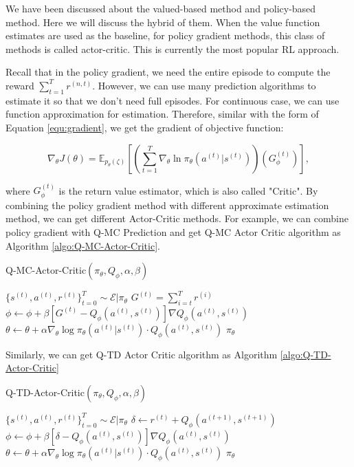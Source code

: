 \documentclass[11pt]{article}
\begin{document}
We have been discussed about the valued-based method and policy-based method. Here we will discuss the hybrid of them. When the value function estimates are used as the baseline, 
for policy gradient methods, this class of methods is called actor-critic. This is currently the most popular RL approach.
  
Recall that in the policy gradient, we need the entire episode to compute the reward $\sum_{t=1}^T r^{(n,t)}$. However, we can use many prediction algorithms to estimate it so that we don’t need full episodes. For continuous case, we can use function approximation for estimation. Therefore, similar with the form of Equation \ref{equ:gradient}, we get the gradient of objective function:

$$\nabla_{\theta} J(\theta) = \mathbb{E}_{p_\theta(\zeta)}[(\sum_{t=1}^T \nabla_\theta \ln \pi_\theta(a^{(t)}|s^{(t)})) (G_\phi^{(t)})],$$

where $G_\phi^{(t)}$ is the return value estimator, which is also called "Critic". By combining the policy gradient method with different approximate estimation method, we can get different Actor-Critic methods. For example, we can combine policy gradient with Q-MC Prediction and get Q-MC Actor Critic algorithm as Algorithm \ref{algo:Q-MC-Actor-Critic}.



\begin{algorithm}[H]
\caption{Q-MC-Actor-Critic$(\pi_\theta,Q_\phi, \alpha, \beta)$}
\label{algo:Q-MC-Actor-Critic}
\begin{algorithmic}[1]
\STATE $\{s^{(t)},a^{(t)},r^{(t)}\}_{t=0}^T \sim \mathcal{E}|\pi_\theta $
\STATE $G^{(t)} = \sum_{i=t}^T r^{(i)}$
\STATE $\phi \leftarrow \phi + \beta[G^{(t)}-Q_\phi(a^{(t)},s^{(t)})]\nabla Q_\phi(a^{(t)},s^{(t)})$
\STATE $\theta \leftarrow \theta+\alpha \nabla_{\theta}\log{\pi_\theta(a^{(t)}|s^{(t)})} \cdot Q_\phi(a^{(t)},s^{(t)}) $
\ENDFOR
\ENDFOR 
\RETURN $\pi_\theta$
\end{algorithmic}
\end{algorithm}


Similarly, we can get Q-TD Actor Critic algorithm as Algorithm \ref{algo:Q-TD-Actor-Critic}

\begin{algorithm}[H]
\caption{Q-TD-Actor-Critic$(\pi_\theta,Q_\phi, \alpha, \beta)$}
\label{algo:Q-TD-Actor-Critic}
\begin{algorithmic}[1]
\STATE $\{s^{(t)},a^{(t)},r^{(t)}\}_{t=0}^T \sim \mathcal{E}|\pi_\theta $
\STATE $\delta \leftarrow r^{(t)} + Q_\phi(a^{(t+1)},s^{(t+1)})$
\STATE $\phi \leftarrow \phi + \beta[\delta-Q_\phi(a^{(t)},s^{(t)})]\nabla Q_\phi(a^{(t)},s^{(t)})$
\STATE $\theta \leftarrow \theta+\alpha \nabla_{\theta}\log{\pi_\theta(a^{(t)}|s^{(t)})} \cdot Q_\phi(a^{(t)},s^{(t)}) $
\ENDFOR
\ENDFOR 
\RETURN $\pi_\theta$
\end{algorithmic}
\end{algorithm}
\end{document}
